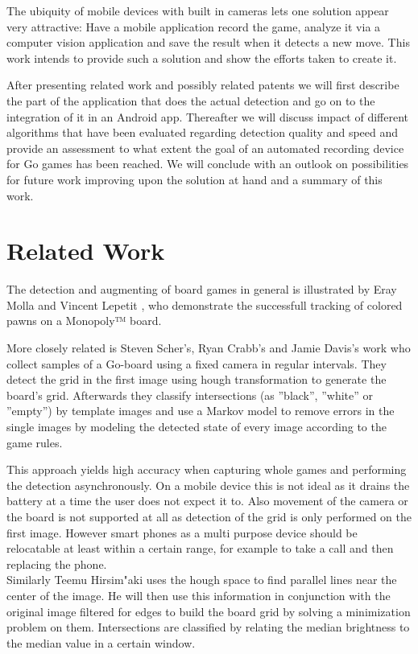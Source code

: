 	The ubiquity of mobile devices with built in cameras lets one solution appear very attractive: Have a mobile application record the game, analyze it via a computer vision application and save the result when it detects a new move. This	work intends to provide such a solution and show the efforts taken to create it.

	After presenting related work and possibly related patents we will first describe the part of the application that does the actual detection and go on to the integration of it in an Android app. Thereafter we will discuss impact of different algorithms that have been evaluated regarding detection quality and speed and provide an assessment to what extent the goal of an automated recording device for Go games has been reached. We will conclude with an outlook on possibilities for future work improving upon the solution at hand and a summary of this work.


	\section{Related Work}
	The detection and augmenting of board games in general is illustrated by Eray Molla and Vincent Lepetit \cite{molla2010augmented}, who demonstrate the successfull tracking of colored pawns on a Monopoly™ board.

	More closely related is  Steven Scher's, Ryan Crabb's and Jamie Davis's work \cite{scher2008making} who collect samples of a Go-board using a fixed camera in regular intervals. They detect the grid in the first image using hough transformation to generate the board's grid. Afterwards they classify intersections (as ''black'', ''white'' or ''empty'') by template images and use a Markov model to remove errors in the single images by modeling the detected state of every image according to the game rules.

	This approach yields high accuracy when capturing whole games and performing the detection asynchronously. On a mobile device this is not ideal as it drains the battery at a time the user does not expect it to. Also movement of the camera or the board is not supported at all as detection of the grid is only performed on the first image. However smart phones as a multi purpose device should be relocatable at least within a certain range, for example to take a call and then replacing the phone.
	\\

	Similarly Teemu Hirsim"aki \cite{hirsimaki2005extracting} uses the hough space to find parallel lines near the center of the image. He will then use this information in conjunction with the original image filtered for edges to build the board grid by solving a minimization problem on them. Intersections are classified by relating the median brightness to the median value in a certain window.

